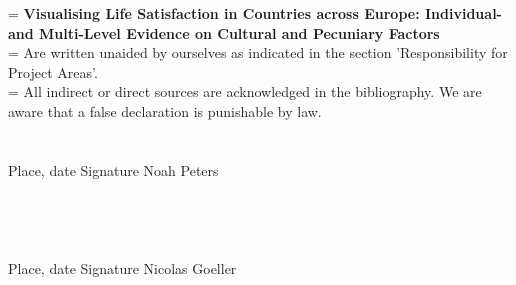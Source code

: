 \documentclass[preprint,12pt,authoryear]{elsarticle}
\begin{document}
	\hangindent=\parindent
	\parindent 0pt
	\textbf{Visualising Life Satisfaction in Countries across Europe: Individual- and Multi-Level Evidence on Cultural and Pecuniary Factors} 
	\\
	
	\hangindent=\parindent
	\parindent 0pt
	Are written unaided by ourselves as indicated in the section 'Responsibility for Project Areas'. 
	\\
	
	\hangindent=\parindent
	\parindent 0pt
	All indirect or direct sources are acknowledged in the bibliography. We are aware that a false declaration is punishable by law. 
	\\
	\\
	\\
	Place, date                                         	Signature Noah Peters
	\\
	\\
	\\
	\\
	\\
	Place, date												Signature Nicolas Goeller
	
	
	
	
\end{document}
